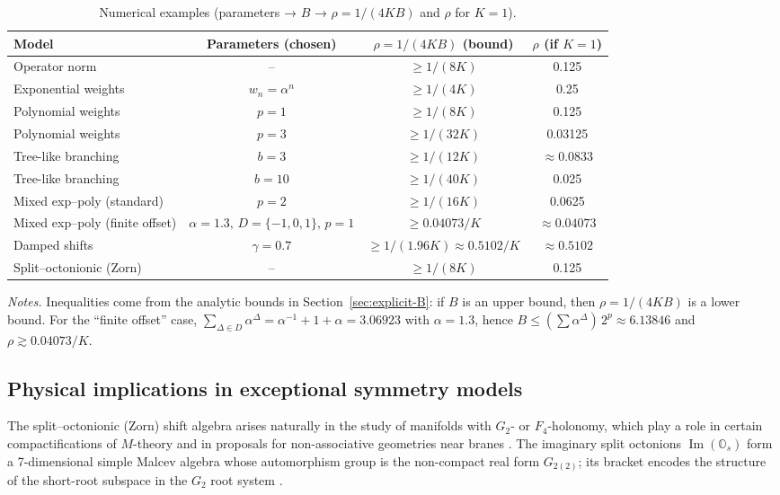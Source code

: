 \documentclass[11pt]{amsart}
\numberwithin{equation}{section}
\theoremstyle{remark}
\begin{document}
\begin{table}[htbp]
\centering
\caption{Numerical examples (parameters → $B$ → $\rho = 1/(4KB)$ and $\rho$ for $K=1$).}
\label{tab:numerical-examples}
\renewcommand{\arraystretch}{1.1}
\setlength{\tabcolsep}{5pt}
\small
\begin{tabular}{l c c c}
\toprule
Model & Parameters (chosen) & $\rho = 1/(4KB)$ (bound) & $\rho$ (if $K=1$) \\
\midrule
Operator norm & -- & $\geq 1/(8K)$ & 0.125 \\
Exponential weights & $w_n = \alpha^n$ & $\geq 1/(4K)$ & 0.25 \\
Polynomial weights & $p = 1$ & $\geq 1/(8K)$ & 0.125 \\
Polynomial weights & $p = 3$ & $\geq 1/(32K)$ & 0.03125 \\
Tree-like branching & $b = 3$ & $\geq 1/(12K)$ & $\approx 0.0833$ \\
Tree-like branching & $b = 10$ & $\geq 1/(40K)$ & 0.025 \\
Mixed exp--poly (standard) & $p = 2$ & $\geq 1/(16K)$ & 0.0625 \\
Mixed exp--poly (finite offset) & $\alpha = 1.3,\, D = \{-1,0,1\},\, p = 1$ & $\geq 0.04073/K$ & $\approx 0.04073$ \\
Damped shifts & $\gamma = 0.7$ & $\geq 1/(1.96K) \approx 0.5102/K$ & $\approx 0.5102$ \\
Split--octonionic (Zorn) & -- & $\geq 1/(8K)$ & 0.125 \\
\bottomrule
\end{tabular}
\end{table}
\vspace{0.4em}
\footnotesize\emph{Notes.}
Inequalities come from the analytic bounds in Section~\ref{sec:explicit-B}: if $B$ is an upper bound, then $\rho = 1/(4KB)$ is a lower bound.
For the “finite offset” case, $\sum_{\Delta\in D}\alpha^{\Delta} = \alpha^{-1} + 1 + \alpha = 3.06923$ with $\alpha = 1.3$, hence
$B \le (\sum \alpha^{\Delta}) \, 2^{p} \approx 6.13846$ and $\rho \gtrsim 0.04073/K$.

\subsection{Physical implications in exceptional symmetry models}\label{sec:phys} 

The split--octonionic (Zorn) shift algebra arises naturally in the study of manifolds with $G_2$- or $F_4$-holonomy, which play a role in certain compactifications of $M$-theory and in proposals for non-associative geometries near branes \cite{GursyTze,Okubo,Baez2002}. The imaginary split octonions $\operatorname{Im}(\mathbb{O}_s)$ form a 7-dimensional simple Malcev algebra whose automorphism group is the non-compact real form $G_{2(2)}$; its bracket encodes the structure of the short-root subspace in the $G_2$ root system \cite[Section 4.3]{Baez2002}.
\end{document}
